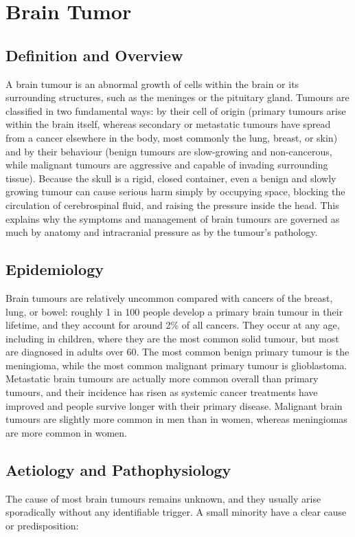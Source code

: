 \chapter{Brain Tumor}

\section*{Definition and Overview}
A brain tumour is an abnormal growth of cells within the brain or its surrounding structures, such as the meninges or the pituitary gland. Tumours are classified in two fundamental ways: by their cell of origin (primary tumours arise within the brain itself, whereas secondary or metastatic tumours have spread from a cancer elsewhere in the body, most commonly the lung, breast, or skin) and by their behaviour (benign tumours are slow-growing and non-cancerous, while malignant tumours are aggressive and capable of invading surrounding tissue). Because the skull is a rigid, closed container, even a benign and slowly growing tumour can cause serious harm simply by occupying space, blocking the circulation of cerebrospinal fluid, and raising the pressure inside the head. This explains why the symptoms and management of brain tumours are governed as much by anatomy and intracranial pressure as by the tumour's pathology.

\section*{Epidemiology}
Brain tumours are relatively uncommon compared with cancers of the breast, lung, or bowel: roughly 1 in 100 people develop a primary brain tumour in their lifetime, and they account for around 2\% of all cancers. They occur at any age, including in children, where they are the most common solid tumour, but most are diagnosed in adults over 60. The most common benign primary tumour is the meningioma, while the most common malignant primary tumour is glioblastoma. Metastatic brain tumours are actually more common overall than primary tumours, and their incidence has risen as systemic cancer treatments have improved and people survive longer with their primary disease. Malignant brain tumours are slightly more common in men than in women, whereas meningiomas are more common in women.

\section*{Aetiology and Pathophysiology}
The cause of most brain tumours remains unknown, and they usually arise sporadically without any identifiable trigger. A small minority have a clear cause or predisposition:


